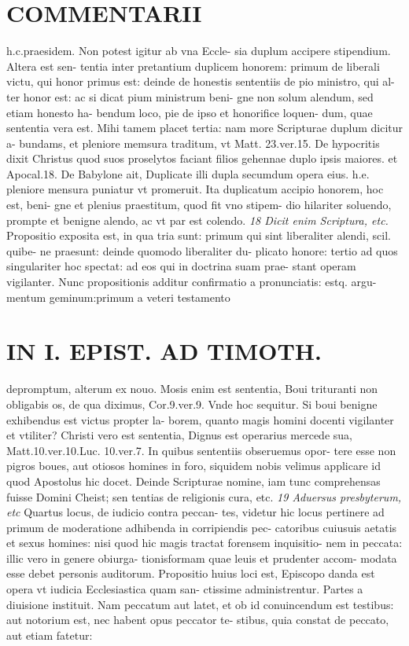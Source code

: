 \documentclass{article}
\begin{document}
\begin{pages}
\section*{COMMENTARII }
\marginpar{[ p.132 ]}\pstart h.c.praesidem. Non potest igitur ab vna Eccle- sia duplum accipere stipendium. Altera est sen- tentia inter pretantium duplicem honorem: primum de liberali victu, qui honor primus est: deinde de honestis sententiis de pio ministro, qui al- ter honor est: ac si dicat pium ministrum beni- gne non solum alendum, sed etiam honesto ha- bendum loco, pie de ipso et honorifice loquen- dum, quae sententia vera est. Mihi tamem placet tertia: nam more Scripturae duplum dicitur a- bundams, et pleniore memsura traditum, vt Matt. 23.ver.15. De hypocritis dixit Christus quod suos proselytos faciant filios gehennae duplo ipsis maiores. et Apocal.18. De Babylone ait, Duplicate illi dupla secumdum opera eius. h.e. pleniore mensura puniatur vt promeruit. Ita duplicatum accipio honorem, hoc est, beni- gne et plenius praestitum, quod fit vno stipem- dio hilariter soluendo, prompte et benigne alendo, ac vt par est colendo.  \pend
\textit{18 Dicit enim Scriptura, etc. }\pstart Propositio exposita est, in qua tria sunt: primum qui sint liberaliter alendi, scil. quibe- ne praesunt: deinde quomodo liberaliter du- plicato honore: tertio ad quos singulariter hoc spectat: ad eos qui in doctrina suam prae- stant operam vigilanter. Nunc propositionis additur confirmatio a pronunciatis: estq. argu- mentum geminum:primum a veteri testamento  \pend
\section*{IN I. EPIST. AD TIMOTH. }
\marginpar{[ p.133 ]}\pstart depromptum, alterum ex nouo. Mosis enim est sententia, Boui trituranti non obligabis os, de qua diximus, Cor.9.ver.9. Vnde hoc sequitur. Si boui benigne exhibendus est victus propter la- borem, quanto magis homini docenti vigilanter et vtiliter? Christi vero est sententia, Dignus est operarius mercede sua, Matt.10.ver.10.Luc. 10.ver.7. In quibus  sententiis obseruemus opor- tere esse non pigros boues, aut otiosos homines in foro, siquidem nobis velimus applicare id quod Apostolus hic docet. Deinde Scripturae nomine, iam tunc comprehensas fuisse Domini Cheist; sen tentias de religionis cura, etc.  \pend
\textit{19 Aduersus presbyterum, etc }\pstart Quartus locus, de iudicio contra peccan- tes, videtur hic locus pertinere ad primum de moderatione adhibenda in corripiendis pec- catoribus  cuiusuis aetatis et sexus homines: nisi quod hic magis tractat forensem inquisitio- nem in peccata: illic vero in genere obiurga- tionisformam quae leuis et prudenter accom- modata esse debet personis auditorum.  \pend\pstart Propositio huius loci est, Episcopo danda est opera vt iudicia Ecclesiastica quam san- ctissime administrentur.  \pend\pstart Partes a diuisione instituit. Nam peccatum aut latet, et ob id conuincendum est testibus: aut notorium est, nec habent opus peccator te- stibus, quia constat de peccato, aut etiam fatetur:  \pend

\end{pages}
\end{document}
